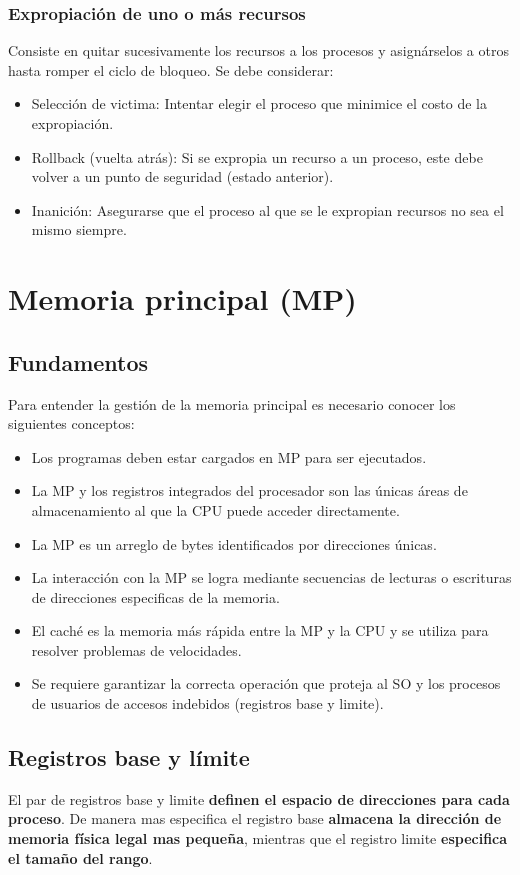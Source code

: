 \documentclass{templateNote}
\begin{document}
\subsubsection*{Expropiación de uno o más recursos}
Consiste en quitar sucesivamente los recursos a los procesos y asignárselos a otros hasta romper el ciclo de bloqueo. Se debe considerar:
\begin{itemize}
    \item Selección de victima: Intentar elegir el proceso que minimice el costo de la expropiación.
    \item Rollback (vuelta atrás): Si se expropia un recurso a un proceso, este debe volver a un punto de seguridad (estado anterior).
    \item Inanición: Asegurarse que el proceso al que se le expropian recursos no sea el mismo siempre.
\end{itemize}

\newpage
\section{Memoria principal (MP)}

\subsection*{Fundamentos}
Para entender la gestión de la memoria principal es necesario conocer los siguientes conceptos:
\begin{itemize}
    \item Los programas deben estar cargados en MP para ser ejecutados.
    \item La MP y los registros integrados del procesador son las únicas áreas de almacenamiento al que la CPU puede acceder directamente.
    \item La MP es un arreglo de bytes identificados por direcciones únicas.
    \item La interacción con la MP se logra mediante secuencias de lecturas o escrituras de direcciones especificas de la memoria.
    \item El caché es la memoria más rápida entre la MP y la CPU y se utiliza para resolver problemas de velocidades. 
    \item Se requiere garantizar la correcta operación que proteja al SO y los procesos de usuarios de accesos indebidos (registros base y limite). 
\end{itemize}

\subsection*{Registros base y límite}
El par de registros base y limite \textbf{definen el espacio de direcciones para cada proceso}. De manera mas especifica el registro base \textbf{almacena la dirección de memoria física legal mas pequeña}, mientras que el registro limite  \textbf{especifica el tamaño del rango}.
\end{document}
